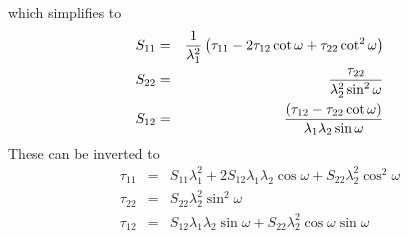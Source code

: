 \documentclass[11pt]{book}
\begin{document}
which simplifies to
\begin{eqnarray}
   S_{11} & = & {1\over\lambda_1^2}\left(\tau_{11} - 2\tau_{12}\cot\omega 
                          + \tau_{22}\cot^2\omega\right) \\
   S_{22} & = & {\tau_{22}\over\lambda_2^2\sin^2\omega} \\
   S_{12} & = & {(\tau_{12}-\tau_{22}\cot\omega)\over \lambda_1\lambda_2 \sin\omega}
\end{eqnarray}
These can be inverted to
\begin{eqnarray}
  \tau_{11} & = & S_{11}\lambda_1^2 + 2 S_{12}\lambda_1\lambda_2\cos\omega + S_{22}\lambda_2^2\cos^2\omega \\
   \tau_{22} & = & S_{22}\lambda_2^2\sin^2\omega \\
   \tau_{12} & = & S_{12}\lambda_1\lambda_2\sin\omega + S_{22}\lambda_2^2\cos\omega\sin\omega
\end{eqnarray}
\end{document}
